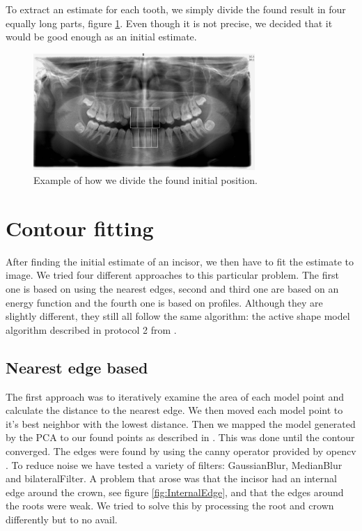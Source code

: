 \documentclass[a4paper,10pt]{article}
\begin{document}
To extract an estimate for each tooth, we simply divide the found result in four equally long parts, figure \ref{fig:split4}. Even though it is not precise, we decided that it would be good enough as an initial estimate.

\begin{figure}[h!]
  \centering
    \includegraphics[width=0.75\textwidth]{images/divide.jpg}
  \caption{Example of how we divide the found initial position.}
  \label{fig:split4}
\end{figure}


\section{Contour fitting}\label{sec:fit}
After finding the initial estimate of an incisor, we then have to fit the estimate to image. We tried four different approaches to this particular problem. The first one is based on using the nearest edges, second and third one are based on an energy function and the fourth one is based on profiles. Although they are slightly different, they still all follow the same algorithm: the active shape model algorithm described in protocol 2 from \cite{TemplateAlgorithm}.

\subsection{Nearest edge based}\label{sec:fit_edge}
The first approach was to iteratively examine the area of each model point and calculate the distance to the nearest edge. We then moved each model point to it's best neighbor with the lowest distance. Then we mapped the model generated by the PCA to our found points as described in \cite{GenerateModel}. This was done until the contour converged. The edges were found by using the canny operator provided by opencv \cite{Canny}. To reduce noise we have tested a variety of filters:  GaussianBlur, MedianBlur and bilateralFilter\cite{PythonFilters}. A problem that arose was that the incisor had an internal edge around the crown, see figure \ref{fig:InternalEdge}, and that the edges around the roots were weak. We tried to solve this by processing the root and crown differently but to no avail.
\end{document}
